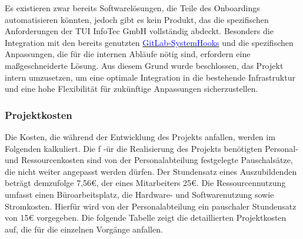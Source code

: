Es existieren zwar bereits Softwarelösungen, die Teile des Onboardings automatisieren könnten, jedoch gibt es kein Produkt, das die spezifischen Anforderungen der \ac{TUI} InfoTec GmbH vollständig abdeckt. Besonders die Integration mit den bereits genutzten \hyperlink{GitLabSystemHooks}{\textcolor{blue}{GitLab-SystemHooks}} und die spezifischen Anpassungen, die für die internen Abläufe nötig sind, erfordern eine maßgeschneiderte Lösung. Aus diesem Grund wurde beschlossen, das Projekt intern umzusetzen, um eine optimale Integration in die bestehende Infrastruktur und eine hohe Flexibilität für zukünftige Anpassungen sicherzustellen.

\subsubsection{Projektkosten}
\label{sec:Projektkosten}

Die Kosten, die während der Entwicklung des Projekts anfallen, werden im Folgenden kalkuliert. Die f
-ür die Realisierung des Projekts benötigten Personal- und Ressourcenkosten sind von der Personalabteilung festgelegte Pauschalsätze, die nicht weiter angepasst werden dürfen. Der Stundensatz eines Auszubildenden beträgt demzufolge 7,56€, der eines Mitarbeiters 25€. Die Ressourcennutzung umfasst einen Büroarbeitsplatz, die Hardware- und Softwarenutzung sowie Stromkosten. Hierfür wird von der Personalabteilung ein pauschaler Stundensatz von 15€ vorgegeben. Die folgende Tabelle zeigt die detaillierten Projektkosten auf, die für die einzelnen Vorgänge anfallen.

